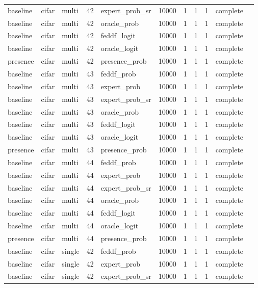 \begin{tabular}{lllrlrrrrll}
baseline & cifar & multi & 42 & expert\_prob\_sr & 10000 & 1 & 1 & 1 & complete &  \\
baseline & cifar & multi & 42 & oracle\_prob & 10000 & 1 & 1 & 1 & complete &  \\
baseline & cifar & multi & 42 & feddf\_logit & 10000 & 1 & 1 & 1 & complete &  \\
baseline & cifar & multi & 42 & oracle\_logit & 10000 & 1 & 1 & 1 & complete &  \\
presence & cifar & multi & 42 & presence\_prob & 10000 & 1 & 1 & 1 & complete &  \\
baseline & cifar & multi & 43 & feddf\_prob & 10000 & 1 & 1 & 1 & complete &  \\
baseline & cifar & multi & 43 & expert\_prob & 10000 & 1 & 1 & 1 & complete &  \\
baseline & cifar & multi & 43 & expert\_prob\_sr & 10000 & 1 & 1 & 1 & complete &  \\
baseline & cifar & multi & 43 & oracle\_prob & 10000 & 1 & 1 & 1 & complete &  \\
baseline & cifar & multi & 43 & feddf\_logit & 10000 & 1 & 1 & 1 & complete &  \\
baseline & cifar & multi & 43 & oracle\_logit & 10000 & 1 & 1 & 1 & complete &  \\
presence & cifar & multi & 43 & presence\_prob & 10000 & 1 & 1 & 1 & complete &  \\
baseline & cifar & multi & 44 & feddf\_prob & 10000 & 1 & 1 & 1 & complete &  \\
baseline & cifar & multi & 44 & expert\_prob & 10000 & 1 & 1 & 1 & complete &  \\
baseline & cifar & multi & 44 & expert\_prob\_sr & 10000 & 1 & 1 & 1 & complete &  \\
baseline & cifar & multi & 44 & oracle\_prob & 10000 & 1 & 1 & 1 & complete &  \\
baseline & cifar & multi & 44 & feddf\_logit & 10000 & 1 & 1 & 1 & complete &  \\
baseline & cifar & multi & 44 & oracle\_logit & 10000 & 1 & 1 & 1 & complete &  \\
presence & cifar & multi & 44 & presence\_prob & 10000 & 1 & 1 & 1 & complete &  \\
baseline & cifar & single & 42 & feddf\_prob & 10000 & 1 & 1 & 1 & complete &  \\
baseline & cifar & single & 42 & expert\_prob & 10000 & 1 & 1 & 1 & complete &  \\
baseline & cifar & single & 42 & expert\_prob\_sr & 10000 & 1 & 1 & 1 & complete &  \\

\end{tabular}
